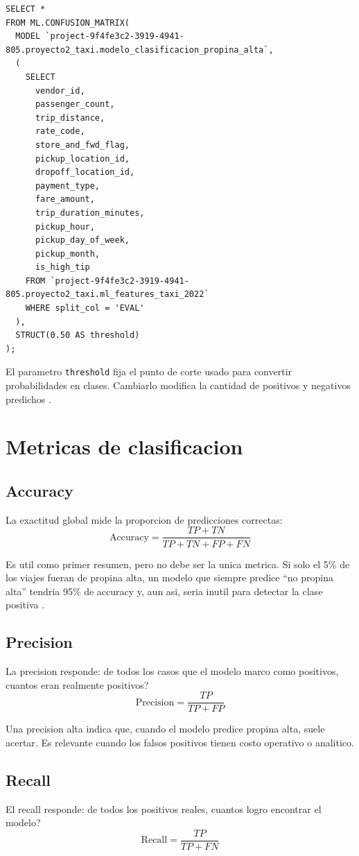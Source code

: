 \documentclass[12pt]{article}
\begin{document}
\begin{lstlisting}[style=sql]
SELECT *
FROM ML.CONFUSION_MATRIX(
  MODEL `project-9f4fe3c2-3919-4941-805.proyecto2_taxi.modelo_clasificacion_propina_alta`,
  (
    SELECT
      vendor_id,
      passenger_count,
      trip_distance,
      rate_code,
      store_and_fwd_flag,
      pickup_location_id,
      dropoff_location_id,
      payment_type,
      fare_amount,
      trip_duration_minutes,
      pickup_hour,
      pickup_day_of_week,
      pickup_month,
      is_high_tip
    FROM `project-9f4fe3c2-3919-4941-805.proyecto2_taxi.ml_features_taxi_2022`
    WHERE split_col = 'EVAL'
  ),
  STRUCT(0.50 AS threshold)
);
\end{lstlisting}

El parametro \texttt{threshold} fija el punto de corte usado para convertir probabilidades en clases. Cambiarlo modifica la cantidad de positivos y negativos predichos \cite{google_thresholding}.

\section{Metricas de clasificacion}
\subsection{Accuracy}
La exactitud global mide la proporcion de predicciones correctas:
\[
\text{Accuracy} = \frac{TP + TN}{TP + TN + FP + FN}
\]

Es util como primer resumen, pero no debe ser la unica metrica. Si solo el 5\% de los viajes fueran de propina alta, un modelo que siempre predice ``no propina alta'' tendria 95\% de accuracy y, aun asi, seria inutil para detectar la clase positiva \cite{google_class_metrics}.

\subsection{Precision}
La precision responde: de todos los casos que el modelo marco como positivos, cuantos eran realmente positivos?
\[
\text{Precision} = \frac{TP}{TP + FP}
\]

Una precision alta indica que, cuando el modelo predice propina alta, suele acertar. Es relevante cuando los falsos positivos tienen costo operativo o analitico.

\subsection{Recall}
El recall responde: de todos los positivos reales, cuantos logro encontrar el modelo?
\[
\text{Recall} = \frac{TP}{TP + FN}
\]
\end{document}
